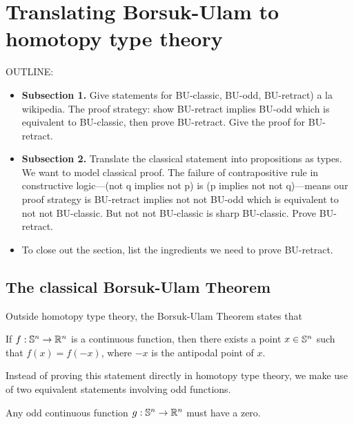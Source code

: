 \documentclass{amsart}
\begin{document}
\section{Translating Borsuk-Ulam to homotopy type theory}
\label{sec:bu-to-hott}

OUTLINE:
\begin{itemize}
\item
  \textbf{Subsection 1.} Give statements for BU-classic,
  BU-odd, BU-retract) a la wikipedia. The proof strategy:
  show BU-retract implies BU-odd which is equivalent to
  BU-classic, then prove BU-retract. Give the proof for
  BU-retract.
\item
  \textbf{Subsection 2.} Translate the classical statement
  into propositions as types. We want to model classical proof.
  The failure of contrapositive rule in constructive
  logic---(not q implies not p) is (p implies not not
  q)---means our proof strategy is BU-retract implies not
  not BU-odd which is equivalent to not not BU-classic. But
  not not BU-classic is sharp BU-classic. Prove BU-retract. 
\item
  To close out the section, list the ingredients we need to
  prove BU-retract.
\end{itemize}

\subsection{The classical Borsuk-Ulam Theorem}

Outside homotopy type theory, the Borsuk-Ulam Theorem states that 

\begin{statement}\label{BUClassic}
  If $f: \mathbb{S}^n \rightarrow \mathbb{R}^n$ is a continuous function, then there
  exists a point $x \in \mathbb{S}^n$ such that $f(x) = f(-x)$, where $-x$ is
  the antipodal point of $x$.
\end{statement}

Instead of proving this statement directly in homotopy type theory, we
make use of two equivalent statements involving odd functions.

\begin{statement}\label{BUOdd}
  Any odd continuous function $g: \mathbb{S}^n \rightarrow \mathbb{R}^n$ must have a
  zero.
\end{statement}
\end{document}
